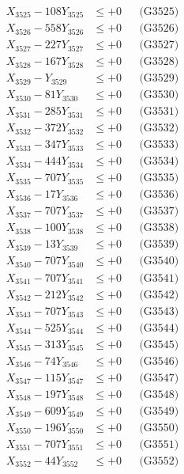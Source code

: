 \documentclass[a4paper,10pt]{article}
\begin{document}
{\begin{align}
X_{3525} - 108Y_{3525} &\leq +0 && \text{(G3525)} \\
X_{3526} - 558Y_{3526} &\leq +0 && \text{(G3526)} \\
X_{3527} - 227Y_{3527} &\leq +0 && \text{(G3527)} \\
X_{3528} - 167Y_{3528} &\leq +0 && \text{(G3528)} \\
X_{3529} - Y_{3529} &\leq +0 && \text{(G3529)} \\
X_{3530} - 81Y_{3530} &\leq +0 && \text{(G3530)} \\
\allowbreak
X_{3531} - 285Y_{3531} &\leq +0 && \text{(G3531)} \\
X_{3532} - 372Y_{3532} &\leq +0 && \text{(G3532)} \\
X_{3533} - 347Y_{3533} &\leq +0 && \text{(G3533)} \\
X_{3534} - 444Y_{3534} &\leq +0 && \text{(G3534)} \\
X_{3535} - 707Y_{3535} &\leq +0 && \text{(G3535)} \\
X_{3536} - 17Y_{3536} &\leq +0 && \text{(G3536)} \\
X_{3537} - 707Y_{3537} &\leq +0 && \text{(G3537)} \\
X_{3538} - 100Y_{3538} &\leq +0 && \text{(G3538)} \\
X_{3539} - 13Y_{3539} &\leq +0 && \text{(G3539)} \\
X_{3540} - 707Y_{3540} &\leq +0 && \text{(G3540)} \\
\allowbreak
X_{3541} - 707Y_{3541} &\leq +0 && \text{(G3541)} \\
X_{3542} - 212Y_{3542} &\leq +0 && \text{(G3542)} \\
X_{3543} - 707Y_{3543} &\leq +0 && \text{(G3543)} \\
X_{3544} - 525Y_{3544} &\leq +0 && \text{(G3544)} \\
X_{3545} - 313Y_{3545} &\leq +0 && \text{(G3545)} \\
X_{3546} - 74Y_{3546} &\leq +0 && \text{(G3546)} \\
X_{3547} - 115Y_{3547} &\leq +0 && \text{(G3547)} \\
X_{3548} - 197Y_{3548} &\leq +0 && \text{(G3548)} \\
X_{3549} - 609Y_{3549} &\leq +0 && \text{(G3549)} \\
X_{3550} - 196Y_{3550} &\leq +0 && \text{(G3550)} \\
\allowbreak
X_{3551} - 707Y_{3551} &\leq +0 && \text{(G3551)} \\
X_{3552} - 44Y_{3552} &\leq +0 && \text{(G3552)} \\

\end{align}}
\end{document}
